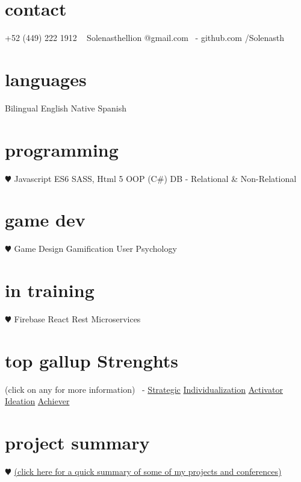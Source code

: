\documentclass[]{cv-style}          %
\begin{document}

\lastupdated


\begin{aside}
%
\section{contact}
+52 (449) 222 1912
~
Solenasthellion
@gmail.com
~-
github.com
/Solenasth
%
\section{languages}
Bilingual English
Native Spanish
%
\section{programming}
{\color{red} $\varheartsuit$} Javascript ES6
SASS, Html 5
OOP (C\#)
DB - Relational \& Non-Relational
\section{game dev}
{\color{red} $\varheartsuit$} Game Design
Gamification
User Psychology
\section{in training}
{\color{red} $\varheartsuit$} Firebase
React
Rest Microservices
\section{top gallup Strenghts}
(click on any for more information)
~-
\href{https://news.gallup.com/businessjournal/718/strategic.aspx}{Strategic}
\href{https://news.gallup.com/businessjournal/685/individualization.aspx}{Individualization}
\href{https://news.gallup.com/businessjournal/625/activator.aspx}{Activator}
\href{https://news.gallup.com/businessjournal/679/ideation.aspx}{Ideation}
\href{https://news.gallup.com/businessjournal/622/achiever.aspx}{Achiever}
%
\section{project summary}
{\color{red} $\varheartsuit$} \href{https://docs.google.com/document/d/1Aj6Jy7RefQvkJJ9pEEydWflzKYrMHOWXZvgLfn9VK6s/edit?usp=sharing}{(click here for a quick summary of some of my projects and conferences)}
\end{aside}
\end{document}
